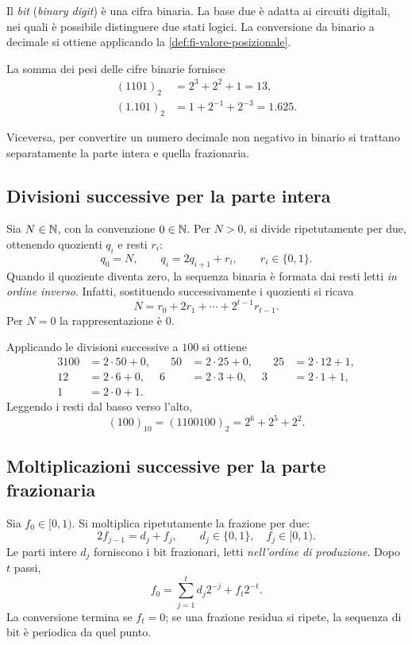 Il \emph{bit} (\emph{binary digit}) è una cifra binaria. La base due è
adatta ai circuiti digitali, nei quali è possibile distinguere due stati
logici. La conversione da binario a decimale si ottiene applicando la
\cref{def:fi-valore-posizionale}.

\begin{example}
La somma dei pesi delle cifre binarie fornisce
\begin{align*}
  (1101)_2&=2^3+2^2+1=13,\\
  (1.101)_2&=1+2^{-1}+2^{-3}=1.625.
\end{align*}
\end{example}

Viceversa, per convertire un numero decimale non negativo in binario
si trattano separatamente la parte intera e quella frazionaria.

\subsection{Divisioni successive per la parte intera}

Sia \(N\in\mathbb{N}\), con la convenzione \(0\in\mathbb{N}\). Per \(N>0\), si divide
ripetutamente per due, ottenendo quozienti \(q_i\) e resti \(r_i\):
\[
  q_0=N,\qquad q_i=2q_{i+1}+r_i,
  \qquad r_i\in\{0,1\}.
\]
Quando il quoziente diventa zero, la sequenza binaria è formata dai resti
letti \emph{in ordine inverso}. Infatti, sostituendo successivamente i
quozienti si ricava
\[
  N=r_0+2r_1+\cdots+2^{t-1}r_{t-1}.
\]
Per \(N=0\) la rappresentazione è \(0\).

\begin{example}
Applicando le divisioni successive a \(100\) si ottiene
\begin{alignat*}{3}
  100&=2\cdot50+0, &\quad 50&=2\cdot25+0, &\quad25&=2\cdot12+1,\\
  12&=2\cdot6+0, & 6&=2\cdot3+0, & 3&=2\cdot1+1,\\
  1&=2\cdot0+1.
\end{alignat*}
Leggendo i resti dal basso verso l'alto,
\[
  (100)_{10}=(1100100)_2=2^6+2^5+2^2.
\]
\end{example}

\subsection{Moltiplicazioni successive per la parte frazionaria}

Sia \(f_0\in[0,1)\). Si moltiplica ripetutamente la frazione per due:
\[
  2f_{j-1}=d_j+f_j,
  \qquad d_j\in\{0,1\},\quad f_j\in[0,1).
\]
Le parti intere \(d_j\) forniscono i bit frazionari, letti
\emph{nell'ordine di produzione}. Dopo \(t\) passi,
\[
  f_0=\sum_{j=1}^{t}d_j2^{-j}+f_t2^{-t}.
\]
La conversione termina se \(f_t=0\); se una frazione residua si ripete,
la sequenza di bit è periodica da quel punto.


